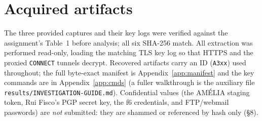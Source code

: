 \documentclass[11pt,a4paper,final,oneside]{article}
\begin{document}
\section{Acquired artifacts}
\label{sec:acquired_artifacts}

The three provided captures and their key logs were verified against the
assignment's Table~1 before analysis; all six SHA-256 match. All extraction was
performed read-only, loading the matching TLS key log so that HTTPS and the
proxied \texttt{CONNECT} tunnels decrypt. Recovered artifacts carry an ID
(\texttt{A3xx}) used throughout; the full byte-exact manifest is
Appendix~\ref{app:manifest} and the key commands are in
Appendix~\ref{app:cmds} (a fuller walkthrough is the auxiliary file
\texttt{results/INVESTIGATION-GUIDE.md}). Confidential values (the AMÉLIA staging
token, Rui Fisco's PGP secret key, the f6 credentials, and FTP/webmail passwords)
are \emph{not} submitted: they are shammed or referenced by hash only (§8).
\end{document}
